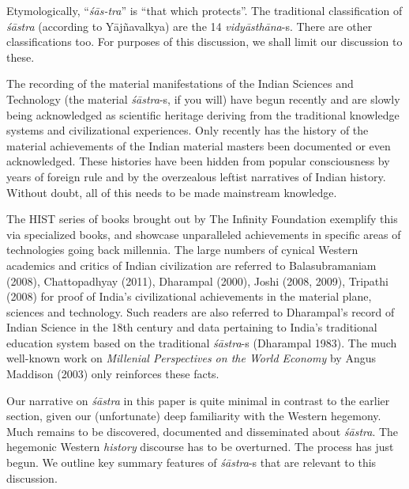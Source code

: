 Etymologically, “\textit{śās-tra}” is “that which protects”. The traditional classification of \textit{śāstra} (according to Yājñavalkya) are the 14 \textit{vidyāsthāna}-s. There are other classifications too. For purposes of this discussion, we shall limit our discussion to these.

The recording of the material manifestations of the Indian Sciences and Technology (the material \textit{śāstra}-s, if you will) have begun recently and are slowly being acknowledged as scientific heritage deriving from the traditional knowledge systems and civilizational experiences. Only recently has the history of the material achievements of the Indian material masters been documented or even acknowledged. These histories have been hidden from popular consciousness by years of foreign rule and by the overzealous leftist narratives of Indian history. Without doubt, all of this needs to be made mainstream knowledge.

The HIST series of books brought out by The Infinity Foundation exemplify this via specialized books, and showcase unparalleled achievements in specific areas of technologies going back millennia. The large numbers of cynical Western academics and critics of Indian civilization are referred to Balasubramaniam (2008), Chattopadhyay (2011), Dharampal (2000), Joshi (2008, 2009), Tripathi (2008) for proof of India’s civilizational achievements in the material plane, sciences and technology. Such readers are also referred to Dharampal’s record of Indian Science in the 18th century and data pertaining to India’s traditional education system based on the traditional \textit{śāstra}-s (Dharampal 1983). The much well-known work on \textit{Millenial Perspectives on the World Economy} by Angus Maddison (2003) only reinforces these facts.

Our narrative on \textit{śāstra} in this paper is quite minimal in contrast to the earlier section, given our (unfortunate) deep familiarity with the Western hegemony. Much remains to be discovered, documented and disseminated about \textit{śāstra}. The hegemonic Western \textit{history} discourse has to be overturned. The process has just begun. We outline key summary features of \textit{śāstra}-s that are relevant to this discussion.

